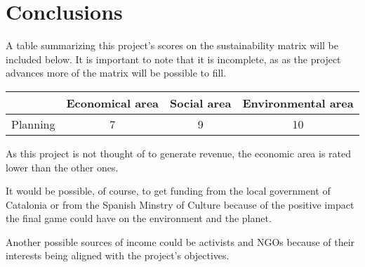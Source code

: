 \section{Conclusions}

A table summarizing this project's scores on the sustainability matrix will be included below. It is important to note that it is incomplete, as as the project advances more of the matrix will be possible to fill.

\begin{center}
  \begin{tabular}{ | c | c | c | c | }
    \hline
         &
        \textbf{Economical area} &
        \textbf{Social area} &
         \textbf{Environmental area} \\ 
        \hline
        Planning & 7 & 9 & 10 \\  
        \hline
  \end{tabular}
\end{center}

As this project is not thought of to generate revenue, the economic area is rated lower than the other ones.

It would be possible, of course, to get funding from the local government of Catalonia or from the Spanish Minstry of Culture
because of the positive impact the final game could have on the environment and the planet.

Another possible sources of income could be activists and \glspl{NGO} because of their interests
being aligned with the project's objectives.
